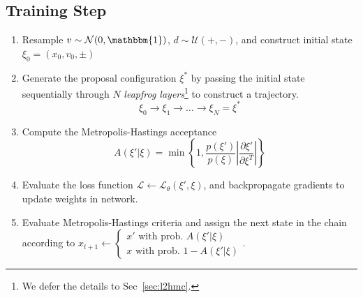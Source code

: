 \documentclass[a4paper,11pt]{article}
\begin{document}
\subsection{\label{subsec:trainstep}Training Step}
%
\begin{enumerate}
    \item Resample \(v \sim \mathcal{N} (0, \mathbbm{1})\),
        \(d \sim \mathcal{U} (+, -)\), and construct initial state
        \(\xi_{0} = (x_{0}, v_{0}, \pm)\)
    \item Generate the proposal configuration \(\xi^{\ast}\) by passing the
        initial state sequentially through \(N\) \emph{leapfrog
        layers}\footnote{
            We defer the details to Sec~\ref{sec:l2hmc}.
        } to construct a trajectory.
	    \begin{equation}
            \xi_{0} \rightarrow \xi_{1} \rightarrow \ldots \rightarrow%
            \xi_{N} = \xi^{\ast}
        \end{equation}
    \item Compute the Metropolis-Hastings acceptance
        \begin{equation}
            A(\xi' | \xi) = 
            \min\left\{1,
            \frac{p(\xi')}{p(\xi)}\left|\frac{\partial \xi'}{\partial \xi^{T}} \right| \right\}
            \label{eq:mhar}
        \end{equation}
    \item Evaluate the loss function \(\mathcal{L} \leftarrow
        \mathcal{L}_{\theta}(\xi', \xi)\), and backpropagate gradients to
        update weights in network.
    \item Evaluate Metropolis-Hastings criteria and assign the next state in
        the chain according to \(
        x_{t+1} \leftarrow \begin{cases} 
            x' \text{ with prob. } A(\xi'|\xi) \\ 
            x \text{ with prob. } 1 - A(\xi'|\xi)
        \end{cases}\).
\end{enumerate}
%
%




\end{document}
